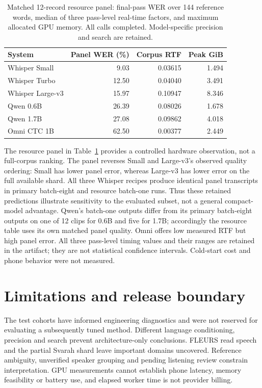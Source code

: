 \documentclass[11pt]{article}
\begin{document}
\begin{table}[h]
\centering
\begin{tabular}{lrrr}\toprule
System & Panel WER (\%) & Corpus RTF & Peak GiB \\\midrule
Whisper Small & 9.03 & 0.03615 & 1.494 \\
Whisper Turbo & 12.50 & 0.04040 & 3.491 \\
Whisper Large-v3 & 15.97 & 0.10947 & 8.346 \\
Qwen 0.6B & 26.39 & 0.08026 & 1.678 \\
Qwen 1.7B & 27.08 & 0.09862 & 4.018 \\
Omni CTC 1B & 62.50 & 0.00377 & 2.449 \\
\bottomrule\end{tabular}
\caption{Matched 12-record resource panel: final-pass WER over 144 reference words, median of three pass-level real-time factors, and maximum allocated GPU memory. All calls completed. Model-specific precision and search are retained.}\label{tab:resource}
\end{table}
The resource panel in Table~\ref{tab:resource} provides a controlled hardware observation, not a full-corpus ranking. The panel reverses Small and Large-v3's observed quality ordering: Small has lower panel error, whereas Large-v3 has lower error on the full available shard. All three Whisper recipes produce identical panel transcripts in primary batch-eight and resource batch-one runs. Thus these retained predictions illustrate sensitivity to the evaluated subset, not a general compact-model advantage. Qwen's batch-one outputs differ from its primary batch-eight outputs on one of 12 clips for 0.6B and five for 1.7B; accordingly the resource table uses its own matched panel quality. Omni offers low measured RTF but high panel error. All three pass-level timing values and their ranges are retained in the artifact; they are not statistical confidence intervals. Cold-start cost and phone behavior were not measured.

\section{Limitations and release boundary}
The test cohorts have informed engineering diagnostics and were not reserved for evaluating a subsequently tuned method. Different language conditioning, precision and search prevent architecture-only conclusions. FLEURS read speech and the partial Svarah shard leave important domains uncovered. Reference ambiguity, unverified speaker grouping and pending listening review constrain interpretation. GPU measurements cannot establish phone latency, memory feasibility or battery use, and elapsed worker time is not provider billing.
\end{document}
